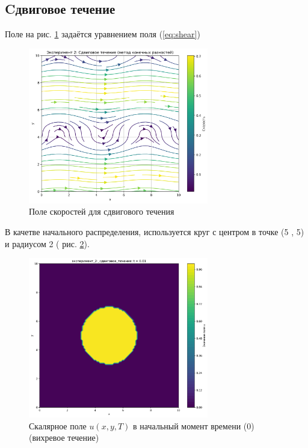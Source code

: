 \subsection{Cдвиговое течение}
Поле на рис. \ref{fig:shear_velocity} задаётся уравнением поля (\ref{eq:shear})
\begin{figure}
	\centering
	\includegraphics[width=0.7\textwidth]{imgs/эксперимент_2:_сдвиговое_течение_fd_velocity_field.png}
	\caption{Поле скоростей для сдвигового течения}
	\label{fig:shear_velocity}
\end{figure}

В качетве начального распределения, используется круг с центром в точке (5 , 5) и радиусом 2 ( рис. \ref{fig:shear_begin}).
\begin{figure}
	\centering
	\includegraphics[width=0.7\textwidth]{imgs/эксперимент_2:_сдвиговое_течение_t0.01.png}
	\caption{Скалярное поле \(u(x,y,T)\) в начальный момент времени (0) (вихревое течение)}
	\label{fig:shear_begin}
\end{figure}

